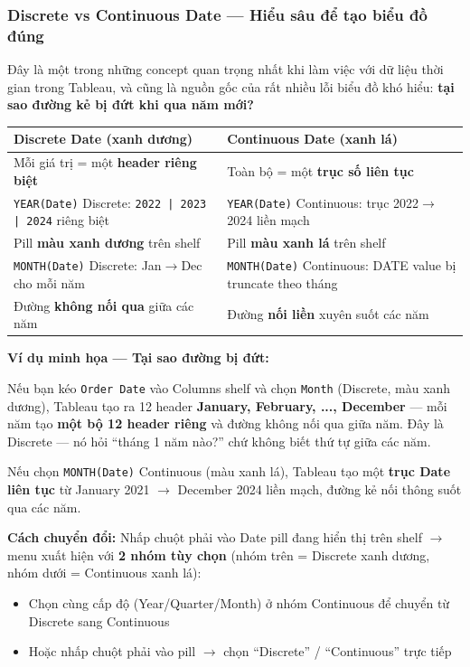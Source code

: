 \documentclass[12pt]{article}
\begin{document}
\subsubsection{Discrete vs Continuous Date --- Hiểu sâu để tạo biểu đồ đúng}

\noindent Đây là một trong những concept quan trọng nhất khi làm việc với dữ liệu thời gian trong Tableau, và cũng là nguồn gốc của rất nhiều lỗi biểu đồ khó hiểu: \textbf{tại sao đường kẻ bị đứt khi qua năm mới?}

\begin{center}
\renewcommand{\arraystretch}{1.4}
\begin{tabularx}{\linewidth}{X X}
\toprule
\textbf{Discrete Date (xanh dương)} & \textbf{Continuous Date (xanh lá)} \\
\midrule
Mỗi giá trị = một \textbf{header riêng biệt} & Toàn bộ = một \textbf{trục số liên tục} \\
\texttt{YEAR(Date)} Discrete: \texttt{2022 | 2023 | 2024} riêng biệt & \texttt{YEAR(Date)} Continuous: trục 2022$\rightarrow$2024 liền mạch \\
Pill \textbf{màu xanh dương} trên shelf & Pill \textbf{màu xanh lá} trên shelf \\
\texttt{MONTH(Date)} Discrete: Jan$\rightarrow$Dec cho mỗi năm & \texttt{MONTH(Date)} Continuous: DATE value bị truncate theo tháng \\
Đường \textbf{không nối qua} giữa các năm & Đường \textbf{nối liền} xuyên suốt các năm \\
\bottomrule
\end{tabularx}
\end{center}

\noindent \textbf{Ví dụ minh họa --- Tại sao đường bị đứt:}

\noindent Nếu bạn kéo \texttt{Order Date} vào Columns shelf và chọn \texttt{Month} (Discrete, màu xanh dương), Tableau tạo ra 12 header \textbf{January, February, ..., December} --- mỗi năm tạo \textbf{một bộ 12 header riêng} và đường không nối qua giữa năm. Đây là Discrete --- nó hỏi ``tháng 1 năm nào?'' chứ không biết thứ tự giữa các năm.

\noindent Nếu chọn \texttt{MONTH(Date)} Continuous (màu xanh lá), Tableau tạo một \textbf{trục Date liên tục} từ January 2021 $\rightarrow$ December 2024 liền mạch, đường kẻ nối thông suốt qua các năm.

\noindent \textbf{Cách chuyển đổi:} Nhấp chuột phải vào Date pill đang hiển thị trên shelf $\rightarrow$ menu xuất hiện với \textbf{2 nhóm tùy chọn} (nhóm trên = Discrete xanh dương, nhóm dưới = Continuous xanh lá):
\begin{itemize}[nosep]
    \item Chọn cùng cấp độ (Year/Quarter/Month) ở nhóm Continuous để chuyển từ Discrete sang Continuous
    \item Hoặc nhấp chuột phải vào pill $\rightarrow$ chọn ``Discrete'' / ``Continuous'' trực tiếp
\end{itemize}
\end{document}
